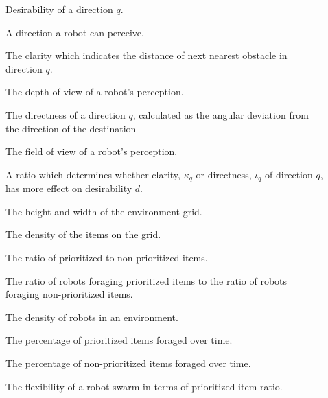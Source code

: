 \begin{description}
	\item[\parbox{\namewidth}{$d$}] Desirability of a direction $q$.
	\item[\parbox{\namewidth}{$q$}] A direction a robot can perceive.
	
	\item[\parbox{\namewidth}{$\kappa_q$}] The clarity which indicates the distance of next nearest obstacle in direction $q$.
	 
	\item[\parbox{\namewidth}{$\eta$}] The depth of view of a robot's perception.

	\item[\parbox{\namewidth}{$\iota_q$}] The directness of a direction $q$, calculated as the angular deviation from the direction of the destination

	\item[\parbox{\namewidth}{$f$}] The	field of view of a robot's perception.
		
	\item[\parbox{\namewidth}{$\lambda$}] A ratio which determines whether clarity, $\kappa_q$ or directness, $\iota_q$ of direction $q$, has more effect on desirability $d$.
	
	\item[\parbox{\namewidth}{$\Lambda$}] The height and width of the environment grid.

	\item[\parbox{\namewidth}{$p$}] The density of the items on the grid.

	\item[\parbox{\namewidth}{$r$}] The ratio of prioritized to non-prioritized items.

	\item[\parbox{\namewidth}{$\tau$}] The ratio of robots foraging prioritized items to the ratio of robots foraging non-prioritized items.

	\item[\parbox{\namewidth}{$c$}] The density of robots in an environment.

	\item[\parbox{\namewidth}{$E_P$}] The percentage of prioritized items foraged over time.

	\item[\parbox{\namewidth}{$E_{NP}$}] The percentage of non-prioritized items foraged over time.

	\item[\parbox{\namewidth}{$F_r$}] The flexibility of a robot swarm in terms of prioritized item ratio.
	

\end{description}
